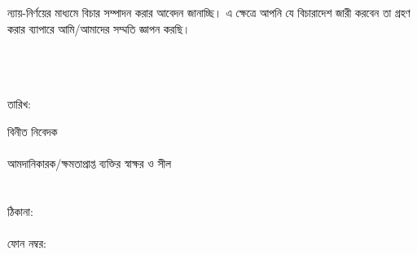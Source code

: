\documentclass[12pt]{article}
\begin{document}
ন্যায়-নির্ণয়ের মাধ্যমে বিচার সম্পাদন করার আবেদন
জানাচ্ছি।
এ ক্ষেত্রে আপনি যে বিচারাদেশ জারী করবেন তা গ্রহণ করার
ব্যাপারে আমি/আমাদের সম্মতি জ্ঞাপন করছি।
\\
\\
\\
\\
\begin{minipage}[t]{0.50\linewidth}
তারিখ:
\end{minipage}
\begin{minipage}[t]{0.50\linewidth}
বিনীত নিবেদক
\\
\\
আমদানিকারক/ক্ষমতাপ্রাপ্ত ব্যক্তির স্বাক্ষর ও সীল
\\
\\
\\
ঠিকানা:
\\
\\
ফোন নম্বর:
\end{minipage}
\thispagestyle{laststyle}
\end{document}
